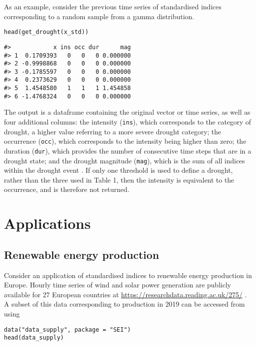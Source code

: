 As an example, consider the previous time series of standardised indices corresponding to a random sample from a gamma distribution.

\begin{verbatim}
head(get_drought(x_std))
\end{verbatim}

\begin{verbatim}
#>            x ins occ dur      mag
#> 1  0.1709393   0   0   0 0.000000
#> 2 -0.9998868   0   0   0 0.000000
#> 3 -0.1785597   0   0   0 0.000000
#> 4  0.2373629   0   0   0 0.000000
#> 5  1.4548580   1   1   1 1.454858
#> 6 -1.4768324   0   0   0 0.000000
\end{verbatim}

The output is a dataframe containing the original vector or time series, as well as four additional columns: the intensity (\texttt{ins}), which corresponds to the category of drought, a higher value referring to a more severe drought category; the occurrence (\texttt{occ}), which corresponds to the intensity being higher than zero; the duration (\texttt{dur}), which provides the number of consecutive time steps that are in a drought state; and the drought magnitude (\texttt{mag}), which is the sum of all indices within the drought event \citep[see][for details]{MckeeEtAl1993}. If only one threshold is used to define a drought, rather than the three used in Table 1, then the intensity is equivalent to the occurrence, and is therefore not returned.

\hypertarget{applications}{%
\section{Applications}\label{applications}}

\hypertarget{renewable-energy-production}{%
\subsection{Renewable energy production}\label{renewable-energy-production}}

Consider an application of standardised indices to renewable energy production in Europe. Hourly time series of wind and solar power generation are publicly available for 27 European countries at \url{https://researchdata.reading.ac.uk/275/} \citep[see][for details]{BloomfieldEtAl2020}. A subset of this data corresponding to production in 2019 can be accessed from  using

\begin{verbatim}
data("data_supply", package = "SEI")
head(data_supply)
\end{verbatim}

